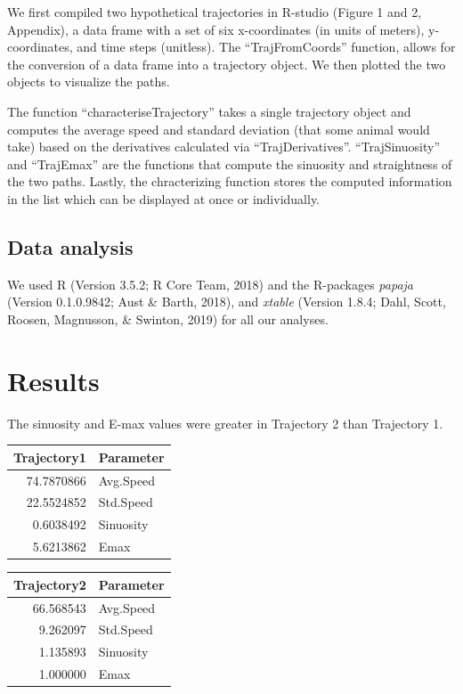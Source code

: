 \documentclass[man]{apa6}
\begin{document}
We first compiled two hypothetical trajectories in R-studio (Figure 1
and 2, Appendix), a data frame with a set of six x-coordinates (in units
of meters), y-coordinates, and time steps (unitless). The
\enquote{TrajFromCoords} function, allows for the conversion of a data
frame into a trajectory object. We then plotted the two objects to
visualize the paths.

The function \enquote{characteriseTrajectory} takes a single trajectory
object and computes the average speed and standard deviation (that some
animal would take) based on the derivatives calculated via
\enquote{TrajDerivatives}. \enquote{TrajSinuosity} and
\enquote{TrajEmax} are the functions that compute the sinuosity and
straightness of the two paths. Lastly, the chracterizing function stores
the computed information in the list which can be displayed at once or
individually.

\subsection{Data analysis}\label{data-analysis}

We used R (Version 3.5.2; R Core Team, 2018) and the R-packages
\emph{papaja} (Version 0.1.0.9842; Aust \& Barth, 2018), and
\emph{xtable} (Version 1.8.4; Dahl, Scott, Roosen, Magnusson, \&
Swinton, 2019) for all our analyses.

\section{Results}\label{results}

The sinuosity and E-max values were greater in Trajectory 2 than
Trajectory 1.

\begin{tabular}{r|l}
\hline
Trajectory1 & Parameter\\
\hline
74.7870866 & Avg.Speed\\
\hline
22.5524852 & Std.Speed\\
\hline
0.6038492 & Sinuosity\\
\hline
5.6213862 & Emax\\
\hline
\end{tabular}

\begin{tabular}{r|l}
\hline
Trajectory2 & Parameter\\
\hline
66.568543 & Avg.Speed\\
\hline
9.262097 & Std.Speed\\
\hline
1.135893 & Sinuosity\\
\hline
1.000000 & Emax\\
\hline
\end{tabular}
\end{document}
